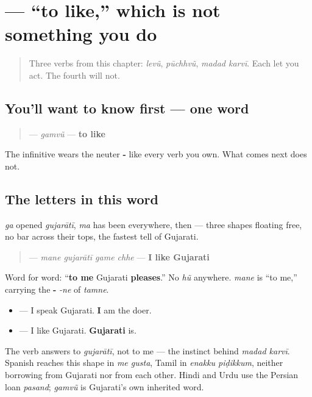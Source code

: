 \section[gamvũ]{ — \textquotedblleft{}to like,\textquotedblright{} which is not something you do}

\label{lesson:GU-C09-gamvun}



\begin{quote}
Three verbs from this chapter: \emph{levũ}, \emph{pūchhvũ}, \emph{madad karvī}. Each let you act. The fourth will not.
\end{quote}

\subsection*{You'll want to know first — one word}
\begin{quote}
\textbf{} — \emph{gamvũ} — \textbf{to like}
\end{quote}

The infinitive wears the neuter \textbf{-} like every verb you own. What comes next does not.

\subsection*{The letters in this word}
\textbf{} \emph{ga} opened \emph{gujarātī}, \textbf{} \emph{ma} has been everywhere, then \textbf{} — three shapes floating free, no bar across their tops, the fastest tell of Gujarati.

\begin{grammarlens}[title={Grammar Lens: you are not the subject of this sentence}]
\begin{quote}
\textbf{   } — \emph{mane gujarātī game chhe} — \textbf{I like Gujarati}
\end{quote}

Word for word: \textquotedblleft{}\textbf{to me} Gujarati \textbf{pleases}.\textquotedblright{} No \emph{hũ} anywhere. \textbf{} \emph{mane} is \textquotedblleft{}to me,\textquotedblright{} carrying the \textbf{-} \emph{-ne} of \textbf{} \emph{tamne}.

\begin{itemize}
\raggedright
  \item \textbf{   } — I speak Gujarati. \textbf{I} am the doer.
  \item \textbf{   } — I like Gujarati. \textbf{Gujarati} is.
\end{itemize}

The verb answers to \emph{gujarātī}, not to me — the instinct behind \emph{madad karvī}. Spanish reaches this shape in \emph{me gusta}, Tamil in \emph{enakku piḍikkum}, neither borrowing from Gujarati nor from each other. Hindi and Urdu use the Persian loan \emph{pasand}; \emph{gamvũ} is Gujarati's own inherited word.
\end{grammarlens}

